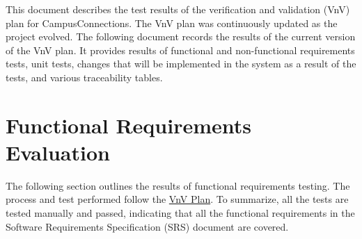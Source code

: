 \documentclass[12pt, titlepage]{article}
\begin{document}
\newpage

\tableofcontents

\listoftables %

\listoffigures %

\newpage


This document describes the test results of the verification and validation (VnV) plan for CampusConnections. The VnV plan was continuously updated as the project evolved. The following document records the results of the current version of the VnV plan. It provides results of functional and non-functional requirements tests, unit tests, changes that will be implemented in the system as a result of the tests, and various traceability tables.


\section{Functional Requirements Evaluation}
The following section outlines the results of functional requirements testing. The process and test performed follow the \href{https://github.com/beatlepie/4G06CapstoneProjectTeam2/blob/main/docs/VnVPlan/VnVPlan.pdf}{VnV Plan}. To summarize, all the tests are tested manually and passed, indicating that all the functional requirements in the Software Requirements Specification (SRS) document are covered.
\end{document}
